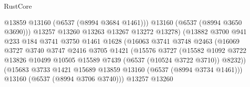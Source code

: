 \begin{lexlean}{RustCore}
\begin{coremodule}
                                        @13859
                                        @13160
                                        (@6537 (@8994 @3684 @1461)))
                                      @13160
                                      (@6537 (@8994 @3650 @3690)))
                                    @13257
                                    @13260
                                    @13263
                                    @13267
                                    @13272
                                    @13278)
                                  (@13882
                                    @3700
                                    @941
                                    @233
                                    @184
                                    @3741
                                    @3750
                                    @1461
                                    @1628
                                    (@16063
                                      @3741
                                      @3748
                                      @2463
                                      (@16069
                                        @3727
                                        @3740
                                        @3747
                                        @2416
                                        @3705
                                        @1421
                                        (@15576
                                          @3727
                                          (@15582
                                            @1092
                                            @3722
                                            @13826
                                            @10499
                                            @10505
                                            @15589
                                            @7439
                                            (@6537 (@10524 @3722 @3710))
                                            @8232))
                                        (@15683
                                          @3733
                                          @1421
                                          @15689
                                          @13859
                                          @13160
                                          (@6537 (@8994 @3734 @1461)))
                                        @13160
                                        (@6537 (@8994 @3706 @3740)))
                                      @13257
                                      @13260

\end{coremodule}
\end{lexlean}
